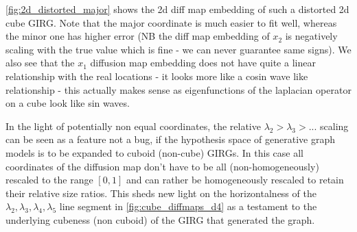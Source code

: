 \cref{fig:2d_distorted_major} shows the 2d diff map embedding of such a distorted 2d cube GIRG. Note that the major coordinate is much easier to fit well, whereas the minor one has higher error (NB the diff map embedding of $x_2$ is negatively scaling with the true value which is fine - we can never guarantee same signs).
We also see that the $x_1$ diffusion map embedding does not have quite a linear relationship with the real locations - it looks more like a cosin wave like relationship - this actually makes sense as eigenfunctions of the laplacian operator on a cube look like sin waves.


In the light of potentially non equal coordinates, the relative $\lambda_2 > \lambda_3 > ...$ scaling can be seen as a feature not a bug, if the hypothesis space of generative graph models is to be expanded to cuboid (non-cube) GIRGs. In this case all coordinates of the diffusion map don't have to be all (non-homogeneously) rescaled to the range $[0, 1]$ and can rather be homogeneously rescaled to retain their relative size ratios.
This sheds new light on the horizontalness of the $\lambda_2, \lambda_3, \lambda_4, \lambda_5$ line segment in \cref{fig:cube_diffmaps_d4} as a testament to the underlying cubeness (non cuboid) of the GIRG that generated the graph.








